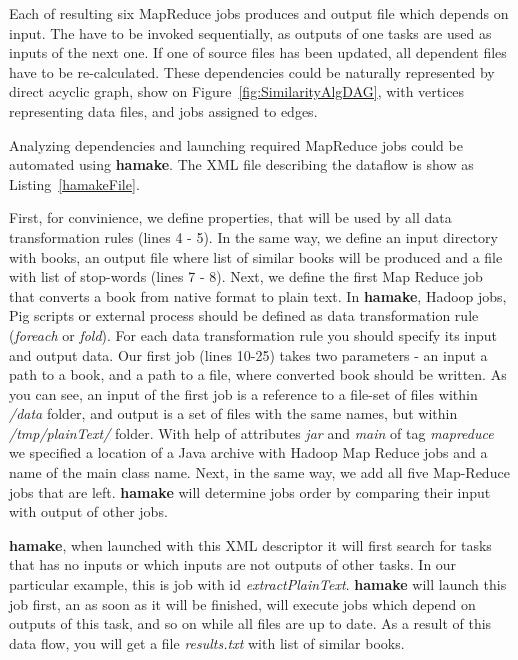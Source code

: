 \documentclass[10pt,conference,letterpaper]{IEEEtran}
\begin{document}
Each of resulting six MapReduce jobs produces and output file which
depends on input. The have to be invoked sequentially, as outputs of
one tasks are used as inputs of the next one. If one of source files
has been updated, all dependent files have to be re-calculated. These
dependencies could be naturally represented by direct acyclic graph,
show on Figure~\ref{fig:SimilarityAlgDAG}, with vertices representing
data files, and jobs assigned to edges.

Analyzing dependencies and launching required MapReduce jobs could be
automated using \textbf{hamake}. The XML file describing the dataflow
is show as Listing~\ref{hamakeFile}.

First, for convinience, we define properties, that will be used by all
data transformation rules (lines 4 - 5). In the same way, we define an
input directory with books, an output file where list of similar books
will be produced and a file with list of stop-words (lines 7 - 8).
Next, we define the first Map Reduce job that converts a book from
native format to plain text. In \textbf{hamake}, Hadoop jobs, Pig scripts or
external process should be defined as data transformation rule
(\textit{foreach} or \textit{fold}). For each data transformation rule
you should specify its input and output data. Our first job (lines
10-25) takes two parameters - an input a path to a book, and a path to
a file, where converted book should be written.  As you can see, an
input of the first job is a reference to a file-set of files within
\textit{/data} folder, and output is a set of files with the same
names, but within \textit{/tmp/plainText/} folder. With help of
attributes \textit{jar} and \textit{main} of tag \textit{mapreduce} we
specified a location of a Java archive with Hadoop Map Reduce jobs and
a name of the main class name. Next, in the same way, we add all five
Map-Reduce jobs that are left. \textbf{hamake} will determine
jobs order by comparing their input with output of other jobs.



\textbf{hamake}, when launched with this XML descriptor it will first search
for tasks that has no inputs or which inputs are not outputs of other
tasks. In our particular example, this is job with id
\textit{extractPlainText}. \textbf{hamake} will launch this job first, an as
soon as it will be finished, will execute jobs which depend on outputs
of this task, and so on while all files are up to date. As a result of
this data flow, you will get a file \textit{results.txt} with list of
similar books.
\end{document}
